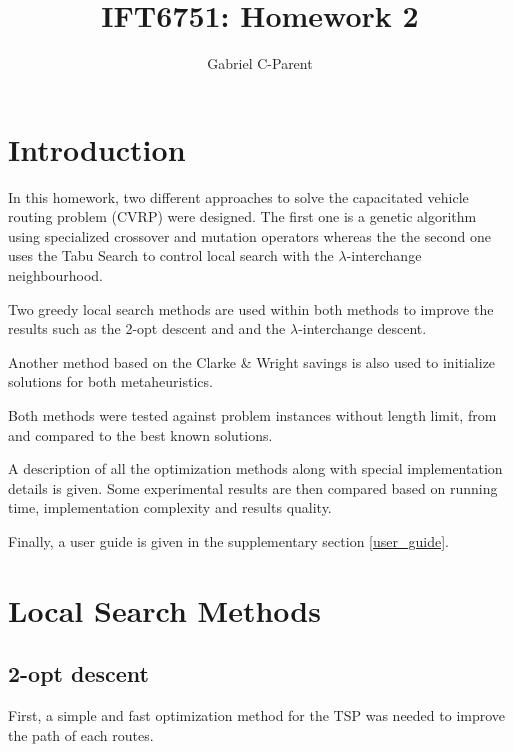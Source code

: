 \documentclass{article} %
\author{
Gabriel C-Parent\\
}
\begin{document}
\title{IFT6751: Homework 2}
      
\maketitle
\section{Introduction}

In this homework, two different approaches to solve the capacitated vehicle routing problem (CVRP) were designed. The first one is a genetic algorithm using specialized crossover and mutation operators whereas the the second one uses the Tabu Search to control local search with the $\lambda$-interchange neighbourhood.\newline

Two greedy local search methods are used within both methods to improve the results such as the 2-opt descent and  and the $\lambda$-interchange descent.\newline

Another method based on the Clarke \& Wright savings is also used to initialize solutions for both metaheuristics.\newline


Both methods were tested against problem instances without length limit, from \citep{christofides} and compared to the best known solutions.\newline


A description of all the optimization methods along with special implementation details is given.
Some experimental results are then compared based on running time, implementation complexity and results quality.\newline

Finally, a user guide is given in the supplementary section \ref{user_guide}.



\newpage
\section{Local Search Methods}
\label{local_search}


\subsection{2-opt descent}
\label{local_tsp}

First, a simple and fast optimization method for the TSP was needed to improve the path of each routes.\newline
\end{document}
